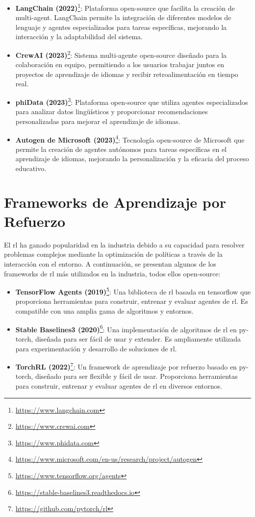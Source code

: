 \begin{itemize}
  \item \textbf{LangChain (2022)}\footnote{\url{https://www.langchain.com}}: Plataforma \gls{open-source} que facilita la creación de \gls{multi-agent}. LangChain permite la integración de diferentes modelos de lenguaje y agentes especializados para tareas específicas, mejorando la interacción y la adaptabilidad del sistema.
  \item \textbf{CrewAI (2023)}\footnote{\url{https://www.crewai.com}}: Sistema multi-agente \gls{open-source} diseñado para la colaboración en equipo, permitiendo a los usuarios trabajar juntos en proyectos de aprendizaje de idiomas y recibir retroalimentación en tiempo real.
  \item \textbf{phiData (2023)}\footnote{\url{https://www.phidata.com}}: Plataforma \gls{open-source} que utiliza agentes especializados para analizar datos lingüísticos y proporcionar recomendaciones personalizadas para mejorar el aprendizaje de idiomas.
  \item \textbf{Autogen de Microsoft (2023)}\footnote{\url{https://www.microsoft.com/en-us/research/project/autogen}}: Tecnología \gls{open-source} de Microsoft que permite la creación de agentes autónomos para tareas específicas en el aprendizaje de idiomas, mejorando la personalización y la eficacia del proceso educativo.
\end{itemize}

\section{Frameworks de Aprendizaje por Refuerzo}

El \gls{rl} ha ganado popularidad en la industria debido a su capacidad para resolver problemas complejos mediante la optimización de políticas a través de la interacción con el entorno. A continuación, se presentan algunos de los frameworks de \gls{rl} más utilizados en la industria, todos ellos \gls{open-source}:

\begin{itemize}
  \item \textbf{TensorFlow Agents (2019)}\footnote{\url{https://www.tensorflow.org/agents}}: Una biblioteca de \gls{rl} basada en \gls{tensorflow} que proporciona herramientas para construir, entrenar y evaluar agentes de \gls{rl}. Es compatible con una amplia gama de algoritmos y entornos.
  \item \textbf{Stable Baselines3 (2020)}\footnote{\url{https://stable-baselines3.readthedocs.io}}: Una implementación de algoritmos de \gls{rl} en \gls{py-torch}, diseñada para ser fácil de usar y extender. Es ampliamente utilizada para experimentación y desarrollo de soluciones de \gls{rl}.
  \item \textbf{TorchRL (2022)}\footnote{\url{https://github.com/pytorch/rl}}: Un framework de aprendizaje por refuerzo basado en \gls{py-torch}, diseñado para ser flexible y fácil de usar. Proporciona herramientas para construir, entrenar y evaluar agentes de \gls{rl} en diversos entornos.
\end{itemize}

